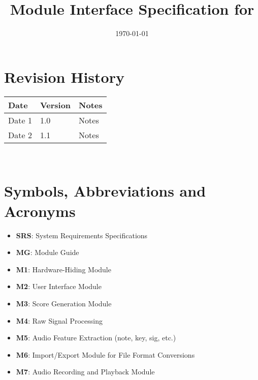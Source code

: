 \documentclass[12pt, titlepage]{article}
\begin{document}
\title{Module Interface Specification for \progname{}}

\author{\authname}

\date{\today}

\maketitle


\section{Revision History}

\begin{tabularx}{\textwidth}{p{3cm}p{2cm}X}
\toprule {\bf Date} & {\bf Version} & {\bf Notes}\\
\midrule
Date 1 & 1.0 & Notes\\
Date 2 & 1.1 & Notes\\
\bottomrule
\end{tabularx}

~\newpage

\section{Symbols, Abbreviations and Acronyms}

\begin{itemize}
    \item \textbf{SRS}: System Requirements Specifications
    \item \textbf{MG}: Module Guide
    \item \textbf{M1}: Hardware-Hiding Module
    \item \textbf{M2}: User Interface Module
    \item \textbf{M3}: Score Generation Module
    \item \textbf{M4}: Raw Signal Processing
    \item \textbf{M5}: Audio Feature Extraction (note, key, sig, etc.)
    \item \textbf{M6}: Import/Export Module for File Format Conversions
    \item \textbf{M7}: Audio Recording and Playback Module
\end{itemize}

\newpage

\tableofcontents

\newpage

\end{document}
